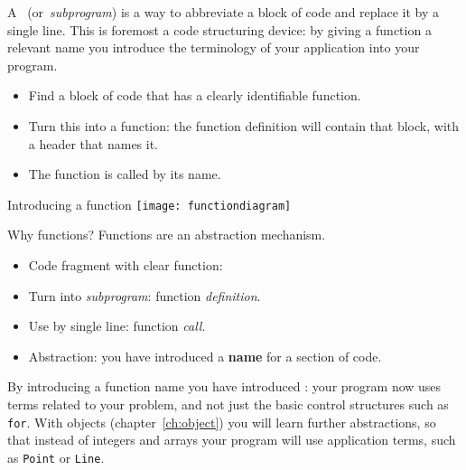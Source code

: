 
A~
(or~\emph{subprogram}) is a way to
abbreviate a block of code and replace it by a single line.
This is foremost a code structuring device: by giving a function a
relevant name you introduce the terminology of your application into
your program.

\begin{itemize}
\item Find a block of code that has a clearly identifiable function.
\item Turn this into a function: the function definition will contain
  that block, with a header that names it.
\item The function is called by its name.
\end{itemize}

\begin{block}{Introducing a function}
  \vskip0pt
  \label{sl:func-scheme}
  \texttt{[image: functiondiagram]}
\end{block}

\begin{slide}{Why functions?}
  \label{sl:function-intro}
  Functions are an abstraction mechanism.
  \begin{itemize}
  \item Code fragment with clear function:
  \item Turn into \emph{subprogram}: function \emph{definition}.
  \item Use by single line: function \emph{call}.
  \item Abstraction: you have introduced a \textbf{name} for a
    section of code.
  \end{itemize}
\end{slide}

By introducing a function name you have introduced
: your program now uses terms related to your
problem, and not
just the basic control structures such as \lstinline{for}.
With objects (chapter~\ref{ch:object}) you will learn further abstractions,
so that instead of integers and arrays
your program will use application terms,
such as \lstinline{Point} or \lstinline{Line}.

